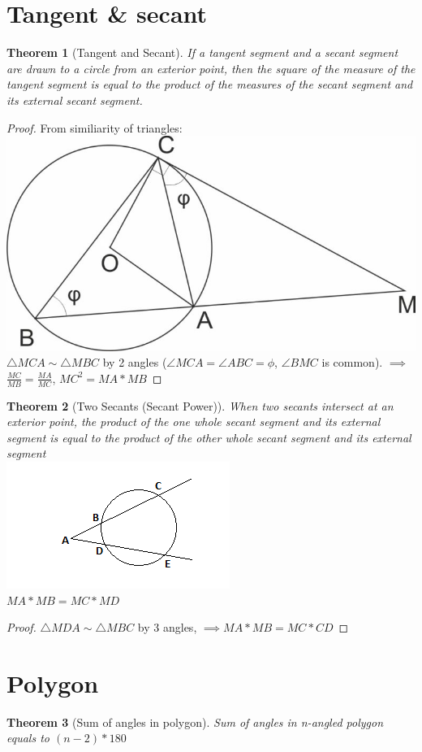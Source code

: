 \documentclass{article}
\newtheorem{theorem}{Theorem}
\begin{document}
\section{Tangent \& secant}
\begin{theorem}[Tangent and Secant]
If a tangent segment and a secant segment are drawn to a circle from an
exterior point, then the square of the measure of the tangent segment is
equal to the product of the measures of the secant segment and its external
secant segment.
\end{theorem}
\begin{proof}
	From similiarity of triangles:\\
	\includegraphics{tangent_n_secant.jpg}\\
	$\triangle{MCA} \sim \triangle{MBC}$ by 2 angles ($\angle{MCA} =
	\angle{ABC} = \phi$, $\angle{BMC}$ is common). $\implies$
	$\frac{MC}{MB} = \frac{MA}{MC}$, $MC^2 = MA * MB$
\end{proof}
\begin{theorem}[Two Secants (Secant Power)]
	When two secants intersect at an exterior point, the product of the
	one whole secant segment and its external segment is equal to the
	product of the other whole secant segment and its external segment\\
	\includegraphics{2secants}\\
	$MA * MB = MC * MD$
\end{theorem}
\begin{proof}
	$\triangle{MDA} \sim \triangle{MBC}$ by 3 angles, $\implies MA * MB = MC * CD$
\end{proof}

\section{Polygon}
\begin{theorem}[Sum of angles in polygon]
	Sum of angles in n-angled polygon equals to $(n - 2) * 180$
\end{theorem}
\end{document}
